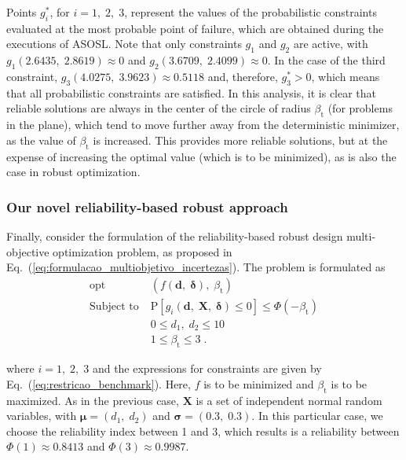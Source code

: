 \documentclass[final,5p,times,twocolumn,numbers]{elsarticle}
\newcommand{\vect}[1]{\mathbf{\boldsymbol{#1}}}
\DeclareMathOperator*{\opt}{opt}
\begin{document}
Points $ g_{i}^{*} $, for $ i = 1, \; 2, \; 3 $, represent the values of the probabilistic constraints evaluated at the most probable point of failure, which are obtained during the executions of ASOSL. Note that only constraints $ g_{1} $ and $ g_{2} $ are active, with $ g_{1} \left( 2.6435, \; 2.8619 \right) \approx 0 $ and $ g_{2} \left( 3.6709, \; 2.4099 \right) \approx 0 $. In the case of the third constraint, $ g_{3} \left( 4.0275, \; 3.9623 \right) \approx 0.5118 $ and, therefore, $ g_{3}^{*} > 0 $, which means that all probabilistic constraints are satisfied. In this analysis, it is clear that reliable solutions are always in the center of the circle of radius $ \beta_{\mathrm{t}} $ (for problems in the plane), which tend to move further away from the deterministic minimizer, as the value of $ \beta_{\mathrm{t}} $ is increased. This provides more reliable solutions, but at the expense of increasing the optimal value (which is to be minimized), as is also the case in robust optimization.

\subsubsection{Our novel reliability-based robust approach} \label{sec:benchmark_novel_approach}

Finally, consider the formulation of the reliability-based robust design multi-objective optimization problem, as proposed in Eq.~(\ref{eq:formulacao_multiobjetivo_incertezas}). The problem is formulated as
%
\begin{equation} \label{eq:multiobjetivo_incertezas_benchmark}
\begin{split}
\opt \; &\left( f \left( \mathbf{d}, \; \vect{\delta} \right), \; \beta_{\mathrm{t}} \right)\\
\textrm{Subject to} \; &\mathrm{P} \left[ g_{i} \left( \mathbf{d}, \; \mathbf{X}, \; \vect{\delta} \right) \leq 0 \right] \leq \Phi \left( -\beta_{\mathrm{t}} \right)\\
\phantom{Subject to} \; &0 \leq d_{1}, \; d_{2} \leq 10\\
\phantom{Subject to} \; &1 \leq \beta_{\mathrm{t}} \leq 3 \; .
\end{split}
\end{equation}

\noindent where $ i = 1, \; 2, \; 3 $ and the expressions for constraints are given by Eq.~(\ref{eq:restricao_benchmark}). Here, $ f $ is to be minimized and $ \beta_{\mathrm{t}} $ is to be maximized. As in the previous case, $ \mathbf{X} $ is a set of independent normal random variables, with $ \vect{\mu} = \left( d_{1}, \; d_{2} \right) $ and $ \vect{\sigma} = \left( 0.3, \; 0.3 \right) $. In this particular case, we choose the reliability index between 1 and 3, which results is a reliability between $ \Phi \left( 1 \right) \approx 0.8413 $ and $ \Phi \left( 3 \right) \approx 0.9987 $.
\end{document}
